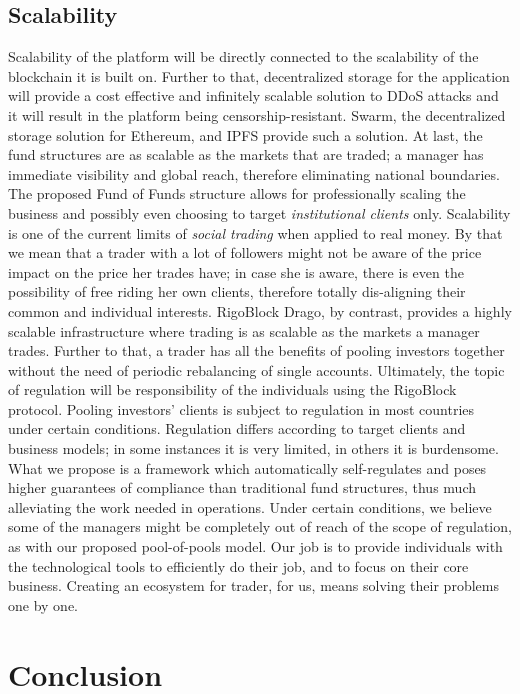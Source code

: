 \documentclass[9pt,oneside]{amsart}
\begin{document}
\begin{multicols}{2}
\subsection{Scalability}

Scalability of the platform will be directly connected to the scalability of the blockchain it is built on. Further to that, decentralized storage for the application will provide a cost effective and infinitely scalable solution to DDoS attacks and it will result in the platform being censorship-resistant.
Swarm, the decentralized storage solution for Ethereum, and IPFS provide such a solution.
At last, the fund structures are as scalable as the markets that are traded; a manager has immediate visibility and global reach, therefore eliminating national boundaries. The proposed Fund of Funds structure allows for professionally scaling the business and possibly even choosing to target \textit{institutional clients} only.
Scalability is one of the current limits of \textit{social trading} when applied to real money. By that we mean that a trader with a lot of followers might not be aware of the price impact on the price her trades have; in case she is aware, there is even the possibility of free riding her own clients, therefore totally dis-aligning their common and individual interests. RigoBlock Drago, by contrast, provides a highly scalable infrastructure where trading is as scalable as the markets a manager trades. Further to that, a trader has all the benefits of pooling investors together without the need of periodic rebalancing of single accounts.
Ultimately, the topic of regulation will be responsibility of the individuals using the RigoBlock protocol. Pooling investors' clients is subject to regulation in most countries under certain conditions. Regulation differs according to target clients and business models; in some instances it is very limited, in others it is burdensome. What we propose is a framework which automatically self-regulates and poses higher guarantees of compliance than traditional fund structures, thus much alleviating the work needed in operations. Under certain conditions, we believe some of the managers might be completely out of reach of the scope of regulation, as with our proposed pool-of-pools model. Our job is to provide individuals with the technological tools to efficiently do their job, and to focus on their core business. Creating an ecosystem for trader, for us, means solving their problems one by one.

\section{Conclusion} \label{ch:conclusion}


\end{multicols}
\end{document}
